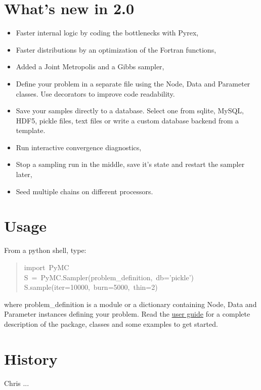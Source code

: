 \section*{What's new in 2.0}
\begin{itemize}
\item {} 
Faster internal logic by coding the bottlenecks with Pyrex,

\item {} 
Faster distributions by an optimization of the Fortran functions,

\item {} 
Added a Joint Metropolis and a Gibbs sampler,

\item {} 
Define your problem in a separate file using the Node, Data and Parameter
classes. Use decorators to improve code readability.

\item {} 
Save your samples directly to a database. Select one from sqlite, MySQL, HDF5,
pickle files, text files or write a custom database backend from a template.

\item {} 
Run interactive convergence diagnostics,

\item {} 
Stop a sampling run in the middle, save it's state and restart the sampler
later,

\item {} 
Seed multiple chains on different processors.

\end{itemize}



\hypertarget{usage}{}
\section*{Usage}

From a python shell, type:
\begin{quote}{\ttfamily \raggedright \noindent
import~PyMC~\\
S~=~PyMC.Sampler(problem{\_}definition,~db='pickle')~\\
S.sample(iter=10000,~burn=5000,~thin=2)
}\end{quote}

where problem{\_}definition is a module or a dictionary containing Node, Data and
Parameter instances defining your problem. Read the \href{docs/pdf/new_interface.pdf}{user guide} for a
complete description of the package, classes and some examples to get started.



\hypertarget{history}{}
\section*{History}

Chris ...



\
